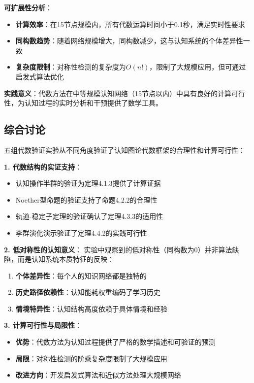 \documentclass[12pt,a4paper]{article}
\begin{document}
\textbf{可扩展性分析}：
\begin{itemize}
    \item \textbf{计算效率}：在15节点规模内，所有代数运算时间小于0.1秒，满足实时性要求
    \item \textbf{同构数趋势}：随着网络规模增大，同构数减少，这与认知系统的个体差异性一致
    \item \textbf{复杂度限制}：对称性检测的复杂度为$O(n!)$，限制了大规模应用，但可通过启发式算法优化
\end{itemize}

\textbf{实践意义}：代数方法在中等规模认知网络（15节点以内）中具有良好的计算可行性，为认知过程的实时分析和干预提供了数学工具。

\subsection{综合讨论}
\label{subsec:algebraic_discussion}

五组代数验证实验从不同角度验证了认知图论代数框架的合理性和计算可行性：

\textbf{1. 代数结构的实证支持}：
\begin{itemize}
    \item 认知操作半群的验证为定理4.1.3提供了计算证据
    \item Noether型命题的验证支持了命题4.2.2的合理性
    \item 轨道-稳定子定理的验证确认了定理4.3.3的适用性
    \item 李群演化演示验证了定理4.4.2的实践可行性
\end{itemize}

\textbf{2. 低对称性的认知意义}：
实验中观察到的低对称性（同构数为0）并非算法缺陷，而是认知系统本质特征的反映：
\begin{enumerate}
    \item \textbf{个体差异性}：每个人的知识网络都是独特的
    \item \textbf{历史路径依赖性}：认知能耗权重编码了学习历史
    \item \textbf{情境特异性}：认知结构高度依赖于具体情境和经验
\end{enumerate}

\textbf{3. 计算可行性与局限性}：
\begin{itemize}
    \item \textbf{优势}：代数方法为认知过程提供了严格的数学描述和可验证的预测
    \item \textbf{局限}：对称性检测的阶乘复杂度限制了大规模应用
    \item \textbf{改进方向}：开发启发式算法和近似方法处理大规模网络
\end{itemize}
\end{document}
